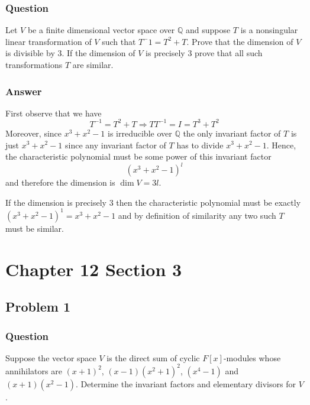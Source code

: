 \documentclass[12pt]{article}
\begin{document}
\subsubsection{Question}
Let $V$ be a finite dimensional vector space over $\mathbb{Q}$ and suppose $T$ is a nonsingular linear transformation of $V$ such that $T^-1 = T^2 +T$. Prove that the dimension of $V$ is divisible by 3. If the dimension of $V$ is precisely 3 prove that all such transformations $T$ are similar.
\subsubsection{Answer}
First observe that we have 
\[ T^{-1} =T^2+T \Rightarrow T T^{-1} = I  = T^3 + T^2 \]
Moreover, since $x^3+x^2 - 1 $ is irreducible over $\mathbb{Q}$ the only invariant factor of $T$ is just $x^3+x^2 - 1 $ since any invariant factor of $T$ has to divide $x^3+x^2 - 1 $. Hence, the characteristic polynomial must be some power of this invariant factor 
\[ (x^3+x^2 -1)^l \]
and therefore the dimension is $\dim{V}=3l$.

If the dimension is precisely $3$ then the characteristic polynomial must be exactly $ (x^3+x^2 -1)^1 =  x^3+x^2 -1 $ and by definition of similarity any two such $T$ must be similar.


\section{Chapter 12 Section 3}
\subsection{Problem 1}

\subsubsection{Question}
Suppose the vector space $V$ is the direct sum of cyclic $F[x]$-modules whose annihilators are $(x+1)^2$, $(x-1)(x^2+1)^2$, $(x^4-1)$ and $(x+1)(x^2-1)$. Determine the invariant factors and elementary divisors for $V$.
\end{document}
